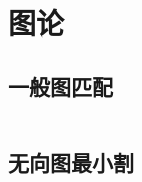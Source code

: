 \chapter{图论}
\section{一般图匹配}
\inputminted{cpp}{\source/graph-theory/general-matching.cpp}
\section{无向图最小割}
\inputminted{cpp}{\source/graph-theory/StoerWagner_O(V^3).cpp}